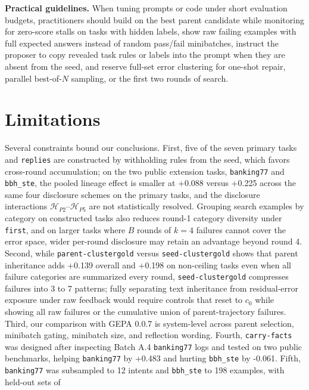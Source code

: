 \documentclass[10pt]{article}
\begin{document}
\textbf{Practical guidelines.} When tuning prompts or code under short
evaluation budgets, practitioners should build on the best parent
candidate while monitoring for zero-score stalls on tasks with hidden
labels, show raw failing examples with full expected answers instead of
random pass/fail minibatches, instruct the proposer to copy revealed
task rules or labels into the prompt when they are absent from the seed,
and reserve full-set error clustering for one-shot repair, parallel
best-of-\(N\) sampling, or the first two rounds of search.

\hypertarget{limitations}{%
\section{Limitations}\label{limitations}}

Several constraints bound our conclusions. First, five of the seven
primary tasks and \texttt{replies} are constructed by withholding rules
from the seed, which favors cross-round accumulation; on the two public
extension tasks, \texttt{banking77} and \texttt{bbh\_ste}, the pooled
lineage effect is smaller at +0.088 versus +0.225 across the same four
disclosure schemes on the primary tasks, and the disclosure interactions
\(\mathcal{H}_{P2}\text{--}\mathcal{H}_{P5}\) are not statistically
resolved. Grouping search examples by category on constructed tasks also
reduces round-1 category diversity under \texttt{first}, and on larger
tasks where \(B\) rounds of \(k=4\) failures cannot cover the error
space, wider per-round disclosure may retain an advantage beyond round
4. Second, while \texttt{parent-clustergold} versus
\texttt{seed-clustergold} shows that parent inheritance adds +0.139
overall and +0.198 on non-ceiling tasks even when all failure categories
are summarized every round, \texttt{seed-clustergold} compresses
failures into 3 to 7 patterns; fully separating text inheritance from
residual-error exposure under raw feedback would require controls that
reset to \(c_0\) while showing all raw failures or the cumulative union
of parent-trajectory failures. Third, our comparison with GEPA 0.0.7 is
system-level across parent selection, minibatch gating, minibatch size,
and reflection wording. Fourth, \texttt{carry-facts} was designed after
inspecting Batch A.4 \texttt{banking77} logs and tested on two public
benchmarks, helping \texttt{banking77} by +0.483 and hurting
\texttt{bbh\_ste} by -0.061. Fifth, \texttt{banking77} was subsampled to
12 intents and \texttt{bbh\_ste} to 198 examples, with held-out sets of
\end{document}
